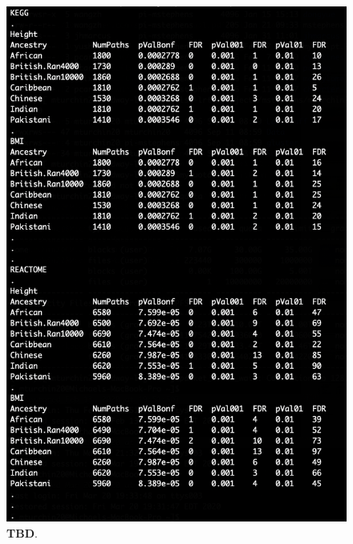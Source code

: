 \documentclass[12pt, a4paper]{article}
\begin{document}
\begin{figure}[htbp]
\centering
\includegraphics[scale=1.5]{Images/Supp/InterPath_Supp_Figure_FDRs_AllPops_vs1.png}
\caption[TBD]{\textbf{TBD}. }
\label{InterPath-Supp-Figure-FDR-AllPops}
\end{figure}
\end{document}
